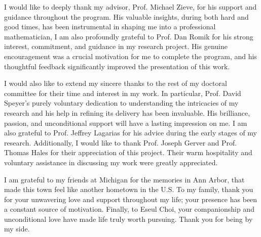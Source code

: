 I would like to deeply thank my advisor, Prof. Michael Zieve,
for his support and guidance throughout the program.
His valuable insights, during both hard and good times,
has been instrumental in shaping me into a professional mathematician,
I am also profoundly grateful to Prof. Dan Romik for his strong interest, commitment, and guidance in my research project.
His genuine encouragement was a crucial motivation for me to complete the program,
and his thoughtful feedback significantly improved the presentation of this work.

I would also like to extend my sincere thanks to the rest of my doctoral committee for their time and interest in my work.
In particular, Prof. David Speyer's purely voluntary dedication to understanding the intricacies of my research and 
his help in refining its delivery has been invaluable.
His brilliance, passion, and unconditional support will have a lasting impression on me.
I am also grateful to Prof. Jeffrey Lagarias for his advice during the early stages of my research. 
Additionally, I would like to thank Prof. Joseph Gerver and Prof. Thomas Hales for their appreciation of this project.
Their warm hospitality and voluntary assistance in discussing my work were greatly appreciated.

I am grateful to my friends at Michigan for the memories in Ann Arbor,
that made this town feel like another hometown in the U.S.
To my family, thank you for your unwavering love and support throughout my life;
your presence has been a constant source of motivation.
Finally, to Eseul Choi, your companionship and unconditional love have made life truly worth pursuing.
Thank you for being by my side.
